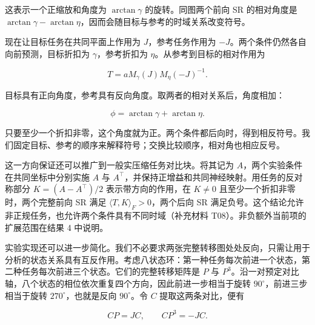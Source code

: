 \documentclass[11pt,a4paper]{article}
\begin{document}
这表示一个正缩放和角度为 \(\arctan\gamma\) 的旋转。同图两个前向 SR
的相对角度是
\(\arctan\gamma-\arctan\eta\)，因而会随目标与参考的时域关系改变符号。

\par
\noindent\begin{minipage}{\linewidth}

现在让目标任务在共同平面上作用为 \(J\)，参考任务作用为
\(-J\)。两个条件仍然各自向前预测，目标折扣为 \(\gamma\)，参考折扣为
\(\eta\)。从参考到目标的相对作用为

\[
T=aM_\gamma(J)M_\eta(-J)^{-1}.
\]

\end{minipage}\par

\par
\noindent\begin{minipage}{\linewidth}

目标具有正向角度，参考具有反向角度。取两者的相对关系后，角度相加：

\[
\phi=\arctan\gamma+\arctan\eta.
\]

\end{minipage}\par

只要至少一个折扣非零，这个角度就为正。两个条件都后向时，得到相反符号。我们固定目标、参考的顺序来解释符号；交换比较顺序，相对角也相应反号。

这一方向保证还可以推广到一般实压缩任务对比块。将其记为
\(A\)，两个实验条件在共同坐标中分别实施 \(A\) 与
\(A^\top\)，并保持正增益和共同神经映射。用任务的反对称部分
\(K=(A-A^\top)/2\) 表示带方向的作用，在 \(K\neq0\)
且至少一个折扣非零时，两个完整前向 SR 满足
\(\langle T,K\rangle_F>0\)，两个后向 SR
满足负号。这个结论允许非正规任务，也允许两个条件具有不同时域（补充材料
T08）。非负额外当前项的扩展范围在结果 4 中说明。

\par
\noindent\begin{minipage}{\linewidth}

实验实现还可以进一步简化。我们不必要求两张完整转移图处处反向，只需让用于分析的状态关系具有互反作用。考虑八状态环：第一种任务每次前进一个状态，第二种任务每次前进三个状态。它们的完整转移矩阵是
\(P\) 与
\(P^3\)。沿一对预定对比轴，八个状态的相位依次重复四个方向，因此前进一步相当于旋转
\(90^\circ\)，前进三步相当于旋转 \(270^\circ\)，也就是反向
\(90^\circ\)。令 \(C\) 提取这两条对比，便有

\[
CP=JC,\qquad CP^3=-JC.
\]

\end{minipage}\par
\end{document}
